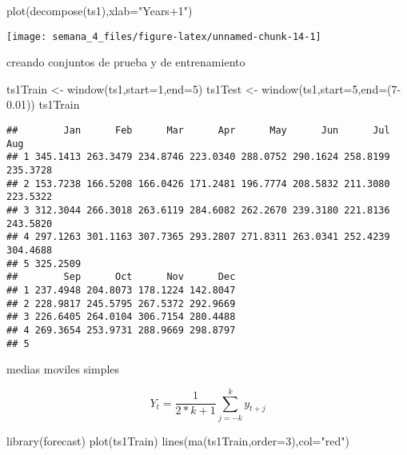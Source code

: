 \documentclass[
]{article}
\newenvironment{Shaded}{\begin{snugshade}}{\end{snugshade}}
\newcommand{\AttributeTok}[1]{\textcolor[rgb]{0.77,0.63,0.00}{#1}}
\newcommand{\DecValTok}[1]{\textcolor[rgb]{0.00,0.00,0.81}{#1}}
\newcommand{\FloatTok}[1]{\textcolor[rgb]{0.00,0.00,0.81}{#1}}
\newcommand{\FunctionTok}[1]{\textcolor[rgb]{0.00,0.00,0.00}{#1}}
\newcommand{\NormalTok}[1]{#1}
\newcommand{\OtherTok}[1]{\textcolor[rgb]{0.56,0.35,0.01}{#1}}
\newcommand{\StringTok}[1]{\textcolor[rgb]{0.31,0.60,0.02}{#1}}
\begin{document}
\begin{Shaded}
\begin{Highlighting}[]
\FunctionTok{plot}\NormalTok{(}\FunctionTok{decompose}\NormalTok{(ts1),}\AttributeTok{xlab=}\StringTok{"Years+1"}\NormalTok{)}
\end{Highlighting}
\end{Shaded}

\begin{center}\texttt{[image: semana\_4\_files/figure-latex/unnamed-chunk-14-1]} \end{center}

creando conjuntos de prueba y de entrenamiento

\begin{Shaded}
\begin{Highlighting}[]
\NormalTok{ts1Train }\OtherTok{\textless{}{-}} \FunctionTok{window}\NormalTok{(ts1,}\AttributeTok{start=}\DecValTok{1}\NormalTok{,}\AttributeTok{end=}\DecValTok{5}\NormalTok{)}
\NormalTok{ts1Test }\OtherTok{\textless{}{-}} \FunctionTok{window}\NormalTok{(ts1,}\AttributeTok{start=}\DecValTok{5}\NormalTok{,}\AttributeTok{end=}\NormalTok{(}\DecValTok{7}\FloatTok{{-}0.01}\NormalTok{))}
\NormalTok{ts1Train}
\end{Highlighting}
\end{Shaded}

\begin{verbatim}
##        Jan      Feb      Mar      Apr      May      Jun      Jul      Aug
## 1 345.1413 263.3479 234.8746 223.0340 288.0752 290.1624 258.8199 235.3728
## 2 153.7238 166.5208 166.0426 171.2481 196.7774 208.5832 211.3080 223.5322
## 3 312.3044 266.3018 263.6119 284.6082 262.2670 239.3180 221.8136 243.5820
## 4 297.1263 301.1163 307.7365 293.2807 271.8311 263.0341 252.4239 304.4688
## 5 325.2509                                                               
##        Sep      Oct      Nov      Dec
## 1 237.4948 204.8073 178.1224 142.8047
## 2 228.9817 245.5795 267.5372 292.9669
## 3 226.6405 264.0104 306.7154 280.4488
## 4 269.3654 253.9731 288.9669 298.8797
## 5
\end{verbatim}

medias moviles simples

\[ Y_{t}=\frac{1}{2*k+1}\sum_{j=-k}^k {y_{t+j}}\]

\begin{Shaded}
\begin{Highlighting}[]
\FunctionTok{library}\NormalTok{(forecast)}
\FunctionTok{plot}\NormalTok{(ts1Train)}
\FunctionTok{lines}\NormalTok{(}\FunctionTok{ma}\NormalTok{(ts1Train,}\AttributeTok{order=}\DecValTok{3}\NormalTok{),}\AttributeTok{col=}\StringTok{"red"}\NormalTok{)}
\end{Highlighting}
\end{Shaded}
\end{document}
